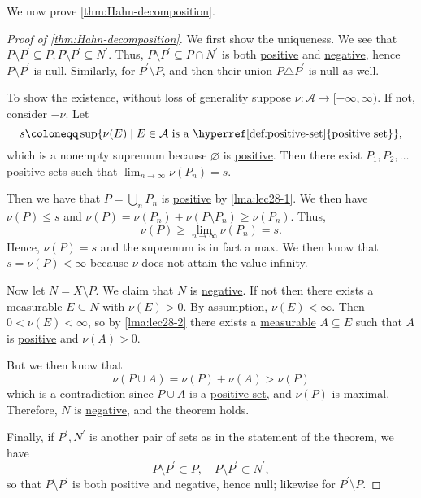 We now prove \autoref{thm:Hahn-decomposition}.
\begin{proof}[Proof of \autoref{thm:Hahn-decomposition}]
	We first show the uniqueness. We see that \(P \setminus P^\prime \subseteq P, P \setminus P^\prime  \subseteq N^\prime \). Thus, \(P \setminus P^\prime  \subseteq P \cap N^\prime \) is both \hyperref[def:positive-set]{positive} and \hyperref[def:negative-set]{negative}, hence \(P \setminus P^\prime\) is \hyperref[def:null-set-signed-measure]{null}. Similarly, for \(P^\prime \setminus P\), and then their union \(P \triangle P^\prime\) is \hyperref[def:null-set-signed-measure]{null} as well.

	To show the existence, without loss of generality suppose \(\nu \colon \mathcal{A} \to [-\infty,\infty)\). If not, consider \(-\nu\). Let
	\[
		s \coloneqq \sup\{\nu(E) \mid E \in \mathcal{A} \text{ is a \hyperref[def:positive-set]{positive set}}\},
	\]
	which is a nonempty supremum because \(\varnothing\) is \hyperref[def:positive-set]{positive}. Then there exist \(P_1,P_2,\dots\) \hyperref[def:positive-set]{positive sets} such that \(\lim_{n\to \infty } \nu(P_n) = s\).

	Then we have that \(P = \bigcup_n P_n\) is \hyperref[def:positive-set]{positive} by \autoref{lma:lec28-1}. We then have \(\nu(P) \leq s\) and \(\nu(P) = \nu(P_n) + \nu(P \setminus P_n) \geq \nu(P_n)\). Thus,
	\[
		\nu(P) \geq \lim_{n \to \infty} \nu(P_n) = s.
	\]
	Hence, \(\nu(P) = s\) and the supremum is in fact a max. We then know that \(s = \nu(P) < \infty\) because \(\nu\) does not attain the value infinity.

	Now let \(N = X \setminus P\). We claim that \(N\) is \hyperref[def:negative-set]{negative}. If not then there exists a \hyperref[def:measurable-set]{measurable} \(E \subseteq N\) with \(\nu(E) > 0\). By assumption, \(\nu(E) < \infty\). Then \(0 < \nu(E) < \infty\), so by \autoref{lma:lec28-2} there exists a \hyperref[def:measurable-set]{measurable} \(A \subseteq E\) such that \(A\) is \hyperref[def:positive-set]{positive} and \(\nu(A) > 0\).

	But we then know that
	\[
		\nu(P \cup A) = \nu(P) + \nu(A) > \nu(P)
	\]
	which is a contradiction since \(P \cup A\) is a \hyperref[def:positive-set]{positive set}, and \(\nu(P)\) is maximal. Therefore, \(N\) is \hyperref[def:negative-set]{negative}, and the theorem holds.

	Finally, if \(P^\prime , N^\prime \) is another pair of sets as in the statement of the theorem, we have
	\[
		P\setminus P^\prime \subset P,\quad P\setminus P^\prime \subset N^\prime,
	\]
	so that \(P\setminus P^\prime \) is both positive and negative, hence null; likewise for \(P^\prime \setminus P\).
\end{proof}

